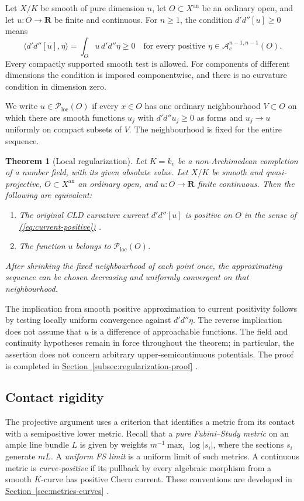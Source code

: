 \documentclass[11pt]{amsart}
\newtheorem{theorem}{Theorem}[section]
\theoremstyle{definition}
\theoremstyle{remark}
\numberwithin{equation}{section}
\newcommand{\ddc}{d'd''}
\newcommand{\an}{\mathrm{an}}
\newcommand{\Ploc}{\mathcal P_{\mathrm{loc}}}
\newcommand{\Ac}{\mathcal A_c}
\newcommand{\R}{\mathbf R}
\newcommand{\namedref}[2]{%
 \begingroup
 \ifstrequal{#1}{Section}{\hypersetup{linkcolor=sectionteal}}{%
  \ifstrequal{#1}{Appendix}{\hypersetup{linkcolor=sectionteal}}{}}%
 \hyperref[#2]{#1~\ref*{#2}}%
 \endgroup}
\renewcommand{\eqref}[1]{%
 \begingroup\hypersetup{linkcolor=equationviolet}%
 \hyperref[#1]{\textup{(\ref*{#1})}}%
 \endgroup}
\begin{document}
Let \(X/K\) be smooth of pure dimension \(n\), let \(O\subset X^\an\)
be an ordinary open, and let \(u:O\to\R\) be finite and continuous.
For \(n\geq1\), the condition \(\ddc[u]\geq0\) means
\begin{equation}\label{eq:current-positive}
 \langle\ddc[u],\eta\rangle
 =\int_O u\,\ddc\eta\geq0
 \quad\text{for every positive }\eta\in\Ac^{n-1,n-1}(O).
\end{equation}
Every compactly supported smooth test is allowed. For components of
different dimensions the condition is imposed componentwise, and there
is no curvature condition in dimension zero.

We write \(u\in\Ploc(O)\) if every \(x\in O\) has one ordinary
neighbourhood \(V\subset O\) on which there are smooth functions \(u_j\)
with \(\ddc u_j\geq0\) as forms and \(u_j\to u\) uniformly on compact
subsets of \(V\). The neighbourhood is fixed for the entire sequence.

\begin{theorem}[Local regularization]\label{thm:main}
Let \(K=k_v\) be a non-Archimedean completion of a number field, with
its given absolute value. Let \(X/K\) be smooth and quasi-projective,
\(O\subset X^\an\) an ordinary open, and \(u:O\to\R\) finite continuous.
Then the following are equivalent:
\begin{enumerate}
\item The original CLD curvature current \(\ddc[u]\) is positive on \(O\)
in the sense of \eqref{eq:current-positive}.
\item The function \(u\) belongs to \(\Ploc(O)\).
\end{enumerate}
After shrinking the fixed neighbourhood of each point once, the
approximating sequence can be chosen decreasing and uniformly convergent
on that neighbourhood.
\end{theorem}

The implication from smooth positive approximation to current positivity
follows by testing locally uniform convergence against \(\ddc\eta\).
The reverse implication does not assume that \(u\) is a difference of
approachable functions. The field and continuity hypotheses remain in
force throughout the theorem; in particular, the assertion does not
concern arbitrary upper-semicontinuous potentials. The proof is completed
in \namedref{Section}{subsec:regularization-proof}.

\subsection{Contact rigidity}
The projective argument uses a criterion that identifies a metric from
its contact with a semipositive lower metric. Recall that a \emph{pure
Fubini--Study metric} on an ample line bundle \(L\) is given by weights
\(m^{-1}\max_i\log|s_i|\), where the sections \(s_i\) generate \(mL\).
A \emph{uniform FS limit} is a uniform limit of such metrics.
A continuous metric is \emph{curve-positive} if its pullback by every
algebraic morphism from a smooth \(K\)-curve has positive Chern current.
These conventions are developed in \namedref{Section}{sec:metrics-curves}.
\end{document}
